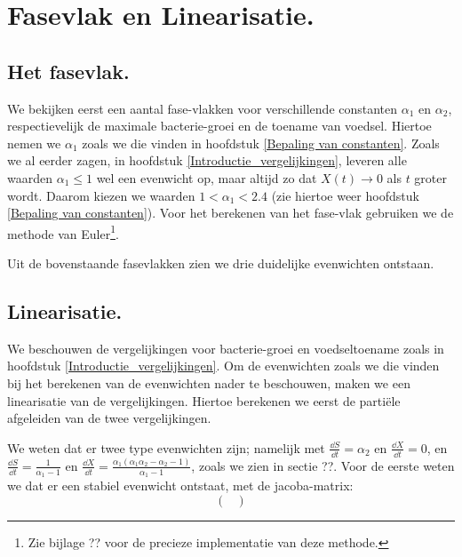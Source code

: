 
\chapter{Fasevlak en Linearisatie.}
\label{Fasevlak en Linearisatie}

\section{Het fasevlak.}

We bekijken eerst een aantal fase-vlakken voor verschillende constanten $\alpha_1$ en $\alpha_2$, respectievelijk de maximale bacterie-groei en de toename van voedsel. Hiertoe nemen we $\alpha_1$ zoals we die vinden in hoofdstuk \ref{Bepaling van constanten}. Zoals we al eerder zagen, in hoofdstuk \ref{Introductie_vergelijkingen}, leveren alle waarden $ \alpha_1 \leq 1$ wel een evenwicht op, maar altijd zo dat $X(t) \to 0$ als $t$ groter wordt. Daarom kiezen we waarden $1 < \alpha_1  < 2.4$ (zie hiertoe weer hoofdstuk \ref{Bepaling van constanten}). Voor het berekenen van het fase-vlak gebruiken we de methode van Euler\footnote{Zie bijlage ?? voor de precieze implementatie van deze methode.}.




Uit de bovenstaande fasevlakken zien we drie duidelijke evenwichten ontstaan. 


\section{Linearisatie.}

We beschouwen de vergelijkingen voor bacterie-groei en voedseltoename zoals in hoofdstuk \ref{Introductie_vergelijkingen}. Om de evenwichten zoals we die vinden bij het berekenen van de evenwichten nader te beschouwen, maken we een linearisatie van de vergelijkingen. Hiertoe berekenen we eerst de parti\"ele afgeleiden van de twee vergelijkingen. 

We weten dat er twee type evenwichten zijn; namelijk met $\frac{\dd S}{\dd t} = \alpha_2$ en $\frac{\dd X}{\dd t} = 0$, en $\frac{\dd S}{\dd t} = \frac{1}{\alpha_1 - 1} $ en $\frac{\dd X}{\dd t} = \frac{\alpha_1(\alpha_1 \alpha_2 - \alpha_2 - 1)}{\alpha_1 - 1}$, zoals we zien in sectie ??. Voor de eerste weten we dat er een stabiel evenwicht ontstaat, met de jacoba-matrix:
\begin{equation*}
	\begin{pmatrix}
		
	\end{pmatrix}
	
\end{equation*}

